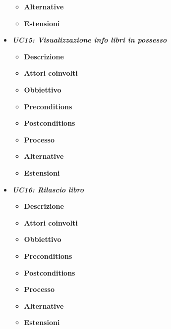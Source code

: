 \begin{itemize}
\begin{itemize}
		\item \textbf{Alternative}
		\item \textbf{Estensioni}
	\end{itemize}
	\item \textbf{\textit{UC15: Visualizzazione info libri in possesso}}
	\begin{itemize}
		\item \textbf{Descrizione}
		\item \textbf{Attori coinvolti}
		\item \textbf{Obbiettivo}
		\item \textbf{Preconditions}
		\item \textbf{Postconditions}
		\item \textbf{Processo}
		\item \textbf{Alternative}
		\item \textbf{Estensioni}
	\end{itemize}
	\item \textbf{\textit{UC16: Rilascio libro}}
	\begin{itemize}
		\item \textbf{Descrizione}
		\item \textbf{Attori coinvolti}
		\item \textbf{Obbiettivo}
		\item \textbf{Preconditions}
		\item \textbf{Postconditions}
		\item \textbf{Processo}
		\item \textbf{Alternative}
		\item \textbf{Estensioni}
	\end{itemize}
\end{itemize}